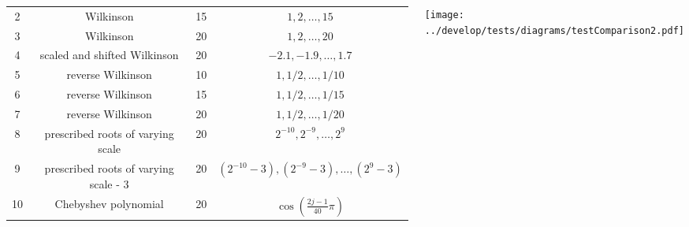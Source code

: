 \documentclass[orientation=landscape]{tikzposter}
\begin{document}
\begin{columns}
{\begin{minipage}{0.45\linewidth}
{\begin{tabular}{c | c | c | c}
			2 & Wilkinson & 15 & $1,2,\ldots,15$\\
			3 & Wilkinson & 20 & $1,2,\ldots,20$\\
			4 & scaled and shifted Wilkinson & 20 & $-2.1,-1.9,\ldots,1.7$\\
			5 & reverse Wilkinson & 10 & $1,1/2,\ldots,1/10$\\
			6 & reverse Wilkinson & 15 & $1,1/2,\ldots,1/15$\\
			7 & reverse Wilkinson & 20 & $1,1/2,\ldots,1/20$\\
			8 & prescribed roots of varying scale & 20 & $2^{-10},2^{-9},\ldots,2^{9}$\\
			9 & prescribed roots of varying scale - 3 & 20 & $(2^{-10}-3),(2^{-9}-3),\ldots,(2^{9}-3)$\\
			10 & Chebyshev polynomial & 20 & $\cos(\frac{2j-1}{40}\pi)$\\
			\end{tabular}}
			\end{minipage}\hfill
			\begin{adjustbox}{valign=t}
			\begin{minipage}[t]{0.55\linewidth}
			\centering
			\vspace*{-4em}
			\texttt{[image: ../develop/tests/diagrams/testComparison2.pdf]}
			\end{minipage}
			\end{adjustbox}
		}
	\end{columns}
\end{document}
